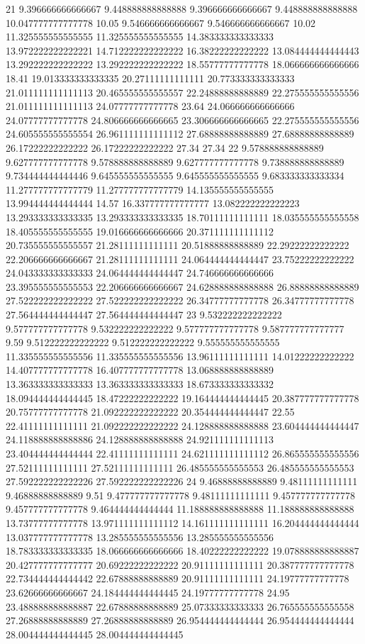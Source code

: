 21 9.396666666666667 9.448888888888888 9.396666666666667 9.448888888888888 10.047777777777778 10.05 9.546666666666667 9.546666666666667 10.02 11.325555555555555 11.325555555555555 14.383333333333333 13.972222222222221 14.712222222222222 16.38222222222222 13.084444444444443 13.292222222222222 13.292222222222222 18.55777777777778 18.066666666666666 18.41 19.013333333333335 20.27111111111111 20.773333333333333 21.011111111111113 20.465555555555557 22.24888888888889 22.275555555555556 21.011111111111113 24.07777777777778 23.64 24.066666666666666 24.07777777777778 24.806666666666665 23.306666666666665 22.275555555555556 24.605555555555554 26.961111111111112 27.68888888888889 27.68888888888889 26.17222222222222 26.17222222222222 27.34 27.34
22 9.578888888888889 9.627777777777778 9.578888888888889 9.627777777777778 9.738888888888889 9.734444444444446 9.645555555555555 9.645555555555555 9.683333333333334 11.277777777777779 11.277777777777779 14.135555555555555 13.994444444444444 14.57 16.337777777777777 13.082222222222223 13.293333333333335 13.293333333333335 18.70111111111111 18.035555555555558 18.405555555555555 19.016666666666666 20.371111111111112 20.735555555555557 21.28111111111111 20.51888888888889 22.29222222222222 22.206666666666667 21.28111111111111 24.064444444444447 23.75222222222222 24.043333333333333 24.064444444444447 24.746666666666666 23.395555555555553 22.206666666666667 24.628888888888888 26.88888888888889 27.522222222222222 27.522222222222222 26.34777777777778 26.34777777777778 27.564444444444447 27.564444444444447
23 9.532222222222222 9.577777777777778 9.532222222222222 9.577777777777778 9.587777777777777 9.59 9.512222222222222 9.512222222222222 9.555555555555555 11.335555555555556 11.335555555555556 13.96111111111111 14.01222222222222 14.407777777777778 16.407777777777778 13.068888888888889 13.363333333333333 13.363333333333333 18.673333333333332 18.094444444444445 18.47222222222222 19.164444444444445 20.387777777777778 20.75777777777778 21.092222222222222 20.354444444444447 22.55 22.41111111111111 21.092222222222222 24.128888888888888 23.604444444444447 24.118888888888886 24.128888888888888 24.921111111111113 23.404444444444444 22.41111111111111 24.621111111111112 26.865555555555556 27.52111111111111 27.52111111111111 26.485555555555553 26.485555555555553 27.592222222222226 27.592222222222226
24 9.46888888888889 9.48111111111111 9.46888888888889 9.51 9.477777777777778 9.48111111111111 9.457777777777778 9.457777777777778 9.464444444444444 11.188888888888888 11.188888888888888 13.73777777777778 13.971111111111112 14.161111111111111 16.204444444444444 13.037777777777778 13.285555555555556 13.285555555555556 18.783333333333335 18.066666666666666 18.40222222222222 19.078888888888887 20.427777777777777 20.69222222222222 20.91111111111111 20.387777777777778 22.734444444444442 22.67888888888889 20.91111111111111 24.19777777777778 23.62666666666667 24.184444444444445 24.19777777777778 24.95 23.488888888888887 22.67888888888889 25.07333333333333 26.765555555555558 27.26888888888889 27.26888888888889 26.954444444444444 26.954444444444444 28.004444444444445 28.004444444444445
